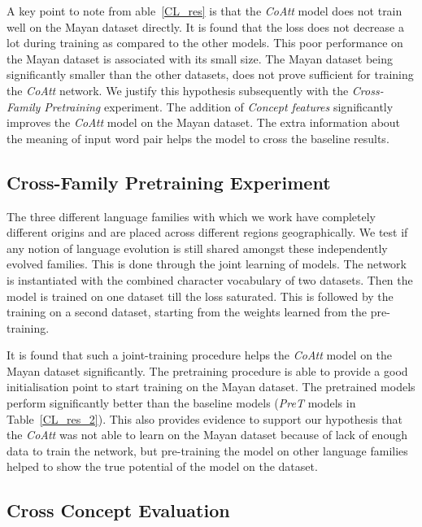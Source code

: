\documentclass[11pt,letterpaper]{article}
\begin{document}
A key point to note from able~\ref{CL_res} is that the \textit{CoAtt} model does not train well on the Mayan dataset directly. It is found that the loss does not decrease a lot during training as compared to the other models. This poor performance on the Mayan dataset is associated with its small size. The Mayan dataset being significantly smaller than the other datasets, does not prove sufficient for training the \textit{CoAtt} network. We justify this hypothesis subsequently with the \textit{Cross-Family Pretraining} experiment. The addition of \textit{Concept features} significantly improves the \textit{CoAtt} model on the Mayan dataset. The extra information about the meaning of input word pair helps the model to cross the baseline results. 

\subsection{Cross-Family Pretraining Experiment}

The three different language families with which we work have completely different origins and are placed across different regions geographically. We test if any notion of language evolution is still shared amongst these independently evolved families. This is done through the joint learning of models. The network is instantiated with the combined character vocabulary of two datasets. Then the model is trained on one dataset till the loss saturated. This is followed by the training on a second dataset, starting from the weights learned from the pre-training. 

It is found that such a joint-training procedure helps the \textit{CoAtt} model on the Mayan dataset significantly. The pretraining procedure is able to provide a good initialisation point to start training on the Mayan dataset. The pretrained models perform significantly better than the baseline models (\textit{PreT} models in Table~\ref{CL_res_2}). This also provides evidence to support our hypothesis that the \textit{CoAtt} was not able to learn on the Mayan dataset because of lack of enough data to train the network, but pre-training the model on other language families helped to show the true potential of the model on the dataset.

\subsection{Cross Concept Evaluation}
\end{document}
